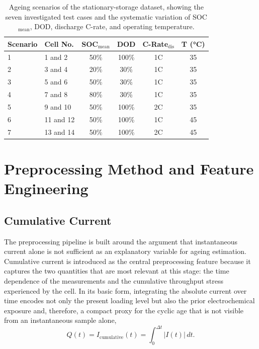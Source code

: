 \documentclass[
    a4paper,
    12pt,
    titlepage,
    bibliography=totoc,
    twoside=on,
    parskip=false,
    numbers=noenddot,
    cleardoublepage=empty,
    DIV=12,
    BCOR=12.0mm,
    headheight=36pt,
    headings=openright
]{scrreprt}
\begin{document}
\begin{table}[H]
    \centering
    \caption[Stationary-storage ageing scenarios.]{Ageing scenarios of the stationary-storage dataset, showing the seven investigated test cases and the systematic variation of SOC$_\mathrm{mean}$, DOD, discharge C-rate, and operating temperature.}
    \label{tab:paper1_scenarios}
    \begin{tabularx}{\textwidth}{@{}llcccc@{}}
        \toprule
        Scenario & Cell No. & SOC$_\mathrm{mean}$ & DOD & C-Rate$_\mathrm{dis}$ & T (\si{\celsius}) \\
        \midrule
        1 & 1 and 2 & 50\% & 100\% & 1C & 35 \\
        2 & 3 and 4 & 20\% & 30\% & 1C & 35 \\
        3 & 5 and 6 & 50\% & 30\% & 1C & 35 \\
        4 & 7 and 8 & 80\% & 30\% & 1C & 35 \\
        5 & 9 and 10 & 50\% & 100\% & 2C & 35 \\
        6 & 11 and 12 & 50\% & 100\% & 1C & 45 \\
        7 & 13 and 14 & 50\% & 100\% & 2C & 45 \\
        \bottomrule
    \end{tabularx}
\end{table}

\section{Preprocessing Method and Feature Engineering}
\subsection{Cumulative Current}
The preprocessing pipeline is built around the argument that instantaneous current alone is not sufficient as an explanatory variable for ageing estimation. Cumulative current is introduced as the central preprocessing feature because it captures the two quantities that are most relevant at this stage: the time dependence of the measurements and the cumulative throughput stress experienced by the cell. In its basic form, integrating the absolute current over time encodes not only the present loading level but also the prior electrochemical exposure and, therefore, a compact proxy for the cyclic age that is not visible from an instantaneous sample alone,
\begin{equation}
Q(t) = I_{\mathrm{cumulative}}(t) = \int_{0}^{\Delta t} \lvert I(t) \rvert \, dt .
\end{equation}
\end{document}
